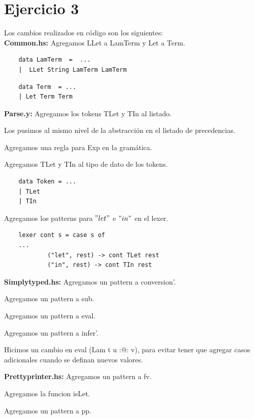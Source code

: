 \documentclass{article}
\begin{document}
	\section*{Ejercicio 3}
	Los cambios realizados en código son los siguientes:\\
	\textbf{Common.hs:} Agregamos LLet a LamTerm y Let a Term.
	\begin{lstlisting}
	data LamTerm  =  ...
	|  LLet String LamTerm LamTerm
	\end{lstlisting}
	\begin{lstlisting}
	data Term  = ...
	| Let Term Term
	\end{lstlisting}
	\textbf{Parse.y:} Agregamos los tokens TLet y TIn al listado. 
	
	Los pusimos al mismo nivel de la abstracción en el listado de precedencias.
	
	Agregamos una regla para Exp en la gramática. 
	
	Agregamos TLet y TIn al tipo de dato de los tokens. 
	\begin{lstlisting}
	data Token = ...
	| TLet
	| TIn
	\end{lstlisting}
	Agregamos los patterns para $"let"$ e $"in"$ en el lexer. 	
	\begin{lstlisting}
	lexer cont s = case s of
	...
			("let", rest) -> cont TLet rest
			("in", rest) -> cont TIn rest
	\end{lstlisting}
	\textbf{Simplytyped.hs:} Agregamos un pattern a conversion'.
	
	Agregamos un pattern a sub.
	
	Agregamos un pattern a eval.
	
	Agregamos un pattern a infer'.
	
	Hicimos un cambio en eval (Lam t u :@: v), para evitar tener que agregar casos adicionales cuando se definan nuevos valores.
	
	\textbf{Prettyprinter.hs:} Agregamos un pattern a fv.
	
	Agregamos la funcion isLet.
	
	Agregamos un pattern a pp.
	
	\newpage
	
\end{document}
